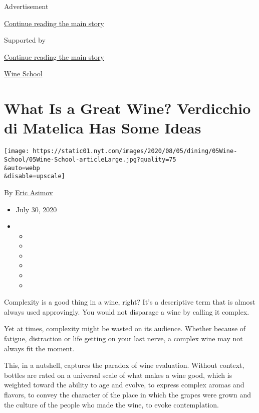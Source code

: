 Advertisement

\protect\hyperlink{after-top}{Continue reading the main story}

Supported by

\protect\hyperlink{after-sponsor}{Continue reading the main story}

\href{/column/wine-school}{Wine School}

\hypertarget{what-is-a-great-wine-verdicchio-di-matelica-has-some-ideas}{%
\section{What Is a Great Wine? Verdicchio di Matelica Has Some
Ideas}\label{what-is-a-great-wine-verdicchio-di-matelica-has-some-ideas}}

\texttt{[image: https://static01.nyt.com/images/2020/08/05/dining/05Wine-School/05Wine-School-articleLarge.jpg?quality=75\\\&auto=webp\\\&disable=upscale]}

By \href{https://www.nytimes.com/by/eric-asimov}{Eric Asimov}

\begin{itemize}
\item
  July 30, 2020
\item
  \begin{itemize}
  \item
  \item
  \item
  \item
  \item
  \item
  \end{itemize}
\end{itemize}

Complexity is a good thing in a wine, right? It's a descriptive term
that is almost always used approvingly. You would not disparage a wine
by calling it complex.

Yet at times, complexity might be wasted on its audience. Whether
because of fatigue, distraction or life getting on your last nerve, a
complex wine may not always fit the moment.

This, in a nutshell, captures the paradox of wine evaluation. Without
context, bottles are rated on a universal scale of what makes a wine
good, which is weighted toward the ability to age and evolve, to express
complex aromas and flavors, to convey the character of the place in
which the grapes were grown and the culture of the people who made the
wine, to evoke contemplation.

